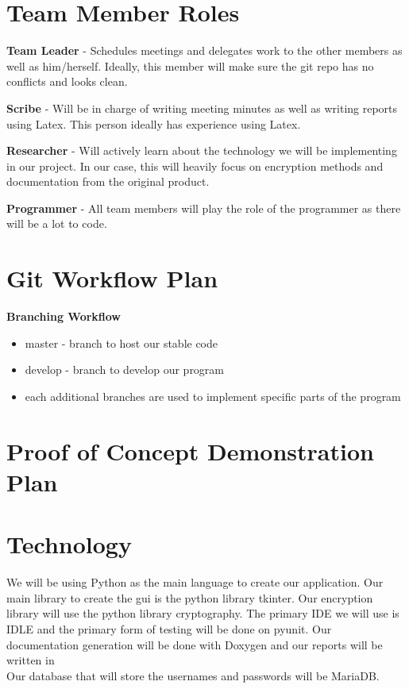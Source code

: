 \documentclass{article}
\begin{document}
\section{Team Member Roles}

\textbf{Team Leader} - Schedules meetings and delegates work to the other members as well as him/herself. Ideally, this member will make sure the git repo has no conflicts and looks clean.

\textbf{Scribe} - Will be in charge of writing meeting minutes as well as writing reports using Latex. This person ideally has experience using Latex.

\textbf{Researcher} - Will actively learn about the technology we will be implementing in our project. In our case, this will heavily focus on encryption methods and documentation from the original product.

\textbf{Programmer} - All team members will play the role of the programmer as there will be a lot to code.

\section{Git Workflow Plan}

\textbf{Branching Workflow}
\begin{itemize}
    \item master - branch to host our stable code
    \item develop - branch to develop our program
    \item each additional branches are used to implement specific parts of the program
\end{itemize}

\section{Proof of Concept Demonstration Plan}



\section{Technology}

We will be using Python as the main language to create our application. Our main library to create the gui is the python library tkinter. Our encryption library will use the python library cryptography. The primary IDE we will use is IDLE and the primary form of testing will be done on pyunit. Our documentation generation will be done with Doxygen and our reports will be written in \latex \\
Our database that will store the usernames and passwords will be MariaDB.
\end{document}
